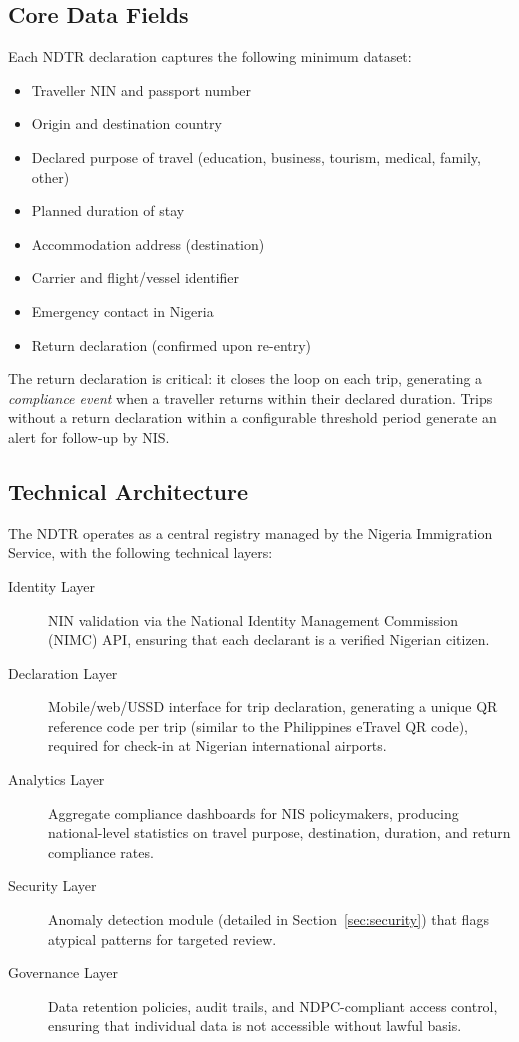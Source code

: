 \documentclass[11pt]{article}
\begin{document}
\subsection{Core Data Fields}

Each NDTR declaration captures the following minimum dataset:

\begin{itemize}
  \item Traveller NIN and passport number
  \item Origin and destination country
  \item Declared purpose of travel (education, business, tourism, medical,
  family, other)
  \item Planned duration of stay
  \item Accommodation address (destination)
  \item Carrier and flight/vessel identifier
  \item Emergency contact in Nigeria
  \item Return declaration (confirmed upon re-entry)
\end{itemize}

The return declaration is critical: it closes the loop on each trip,
generating a \textit{compliance event} when a traveller returns within
their declared duration. Trips without a return declaration within a
configurable threshold period generate an alert for follow-up by NIS.

\subsection{Technical Architecture}

The NDTR operates as a central registry managed by the Nigeria
Immigration Service, with the following technical layers:

\begin{description}
  \item[Identity Layer] NIN validation via the National Identity
  Management Commission (NIMC) API, ensuring that each declarant is a
  verified Nigerian citizen.

  \item[Declaration Layer] Mobile/web/USSD interface for trip
  declaration, generating a unique QR reference code per trip (similar
  to the Philippines eTravel QR code), required for check-in at
  Nigerian international airports.

  \item[Analytics Layer] Aggregate compliance dashboards for NIS
  policymakers, producing national-level statistics on travel purpose,
  destination, duration, and return compliance rates.

  \item[Security Layer] Anomaly detection module (detailed in
  Section~\ref{sec:security}) that flags atypical patterns for
  targeted review.

  \item[Governance Layer] Data retention policies, audit trails, and
  NDPC-compliant access control, ensuring that individual data is
  not accessible without lawful basis.
\end{description}
\end{document}
